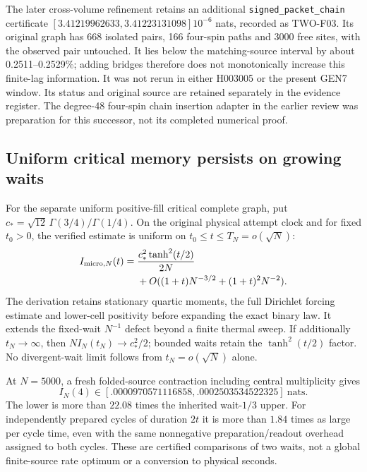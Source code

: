 The later cross-volume refinement retains an additional
\texttt{signed\_packet\_chain} certificate
$[3.41219962633,3.41223131098]10^{-6}$ nats, recorded as TWO-F03.
Its original graph has 668 isolated pairs, 166 four-spin paths and 3000 free sites, with the observed pair untouched. It lies below the matching-source interval by about 0.2511--0.2529\%; adding bridges therefore does not monotonically increase this finite-lag information. It was not rerun in either H003005 or the present GEN7 window. Its status
and original source are retained separately in the evidence register.
The degree-48 four-spin chain insertion adapter in the earlier review
was preparation for this successor, not its completed numerical proof.

\subsection{Uniform critical memory persists on growing waits}
\label{sec:growing-memory-12}

For the separate uniform positive-fill critical complete graph, put
$c_*=\sqrt{12}\,\Gamma(3/4)/\Gamma(1/4)$. On the original physical
attempt clock and for fixed $t_0>0$, the verified estimate is uniform on
$t_0\le t\le T_N=o(\sqrt N)$:
\begin{equation}
 \begin{split}
 I_{{\rm micro},N}(t)
 ={}&\frac{c_*^2\tanh^2(t/2)}{2N}\\
 &+O((1+t)N^{-3/2}+(1+t)^2N^{-2}).
 \end{split}
\label{eq:growing-memory-12}
\end{equation}
The derivation retains stationary quartic moments, the full Dirichlet
forcing estimate and lower-cell positivity before expanding the exact
binary law. It extends the fixed-wait $N^{-1}$ defect beyond a finite
thermal sweep. If additionally $t_N\to\infty$, then
$NI_N(t_N)\to c_*^2/2$; bounded waits retain the $\tanh^2(t/2)$ factor.
No divergent-wait limit follows from $t_N=o(\sqrt N)$ alone.

At $N=5000$, a fresh folded-source contraction including central
multiplicity gives
\begin{equation}
 I_N(4)\in[.0000970571116858,.0002503534522325]\ \mathrm{nats}.
\end{equation}
The lower is more than $22.08$ times the inherited wait-$1/3$ upper.
For independently prepared cycles of duration $2t$ it is more than
$1.84$ times as large per cycle time, even with the same nonnegative
preparation/readout overhead assigned to both cycles. These are certified
comparisons of two waits, not a global finite-source rate optimum or a
conversion to physical seconds.

